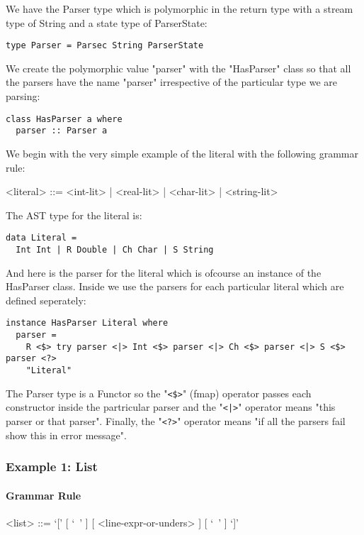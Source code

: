\documentclass{article}
\begin{document}
We have the Parser type which is polymorphic in the return
type with a stream type of String and a state type of ParserState:
\begin{verbatim}
type Parser = Parsec String ParserState

\end{verbatim}
We create the polymorphic value "parser" with the "HasParser" class
so that all the parsers have the name "parser" irrespective of the particular 
type we are parsing:
\begin{verbatim}
class HasParser a where
  parser :: Parser a

\end{verbatim}
We begin with the very simple example of the literal with the following 
grammar rule:
\begin{grammar}
<literal> ::= <int-lit> | <real-lit> | <char-lit> | <string-lit>\\
\end{grammar}
The AST type for the literal is:
\begin{verbatim}
data Literal = 
  Int Int | R Double | Ch Char | S String 

\end{verbatim}
And here is the parser for the literal which is ofcourse an instance of the 
HasParser class. Inside we use the parsers for each particular literal which
are defined seperately:
\begin{verbatim}
instance HasParser Literal where
  parser =
    R <$> try parser <|> Int <$> parser <|> Ch <$> parser <|> S <$> parser <?>
    "Literal"

\end{verbatim}
The Parser type is a Functor so the "\texttt{<\$>}" (fmap) operator passes each 
constructor inside the partricular parser and the "\texttt{<|>}" operator means
"this parser or that parser". Finally, the "\texttt{<?>}" operator means "if
all the parsers fail show this in error message".

\subsubsection{Example 1: List}

\paragraph{Grammar Rule}

\begin{grammar}
<list> ::= `[' [ `\ ' ] [ <line-expr-or-unders> ] [ `\ ' ] `]'
\end{grammar}
\end{document}
